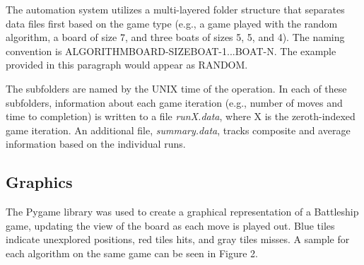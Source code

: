 \documentclass[]{article}
\begin{document}
The automation system utilizes a multi-layered folder structure that separates data files first based on the game type (e.g., a game played with the random algorithm, a board of size 7, and three boats of sizes 5, 5, and 4). The naming convention is ALGORITHM\textunderscore BOARD-SIZE\textunderscore BOAT-1\textunderscore...\textunderscore BOAT-N. The example provided in this paragraph would appear as RANDOM.

The subfolders are named by the UNIX time of the operation. In each of these subfolders, information about each game iteration (e.g., number of moves and time to completion) is written to a file \textit{runX.data}, where X is the zeroth-indexed game iteration. An additional file, \textit{summary.data}, tracks composite and average information based on the individual runs. 

\subsection{Graphics}

The Pygame library was used to create a graphical representation of a Battleship game, updating the view of the board as each move is played out. Blue tiles indicate unexplored positions, red tiles hits, and gray tiles misses. A sample for each algorithm on the same game can be seen in Figure 2. 
\end{document}
